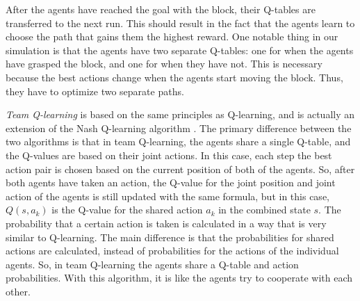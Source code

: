 After the agents have reached the goal with the block, their Q-tables are transferred to the next run. This should result in the fact that the agents learn to choose the path that gains them the highest reward. One notable thing in our simulation is that the agents have two separate Q-tables: one for when the agents have grasped the block, and one for when they have not. This is necessary because the best actions change when the agents start moving the block. Thus, they have to optimize two separate paths.

\textit{Team Q-learning} is based on the same principles as Q-learning, and is actually an extension of the Nash Q-learning algorithm \cite{hu}. The primary difference between the two algorithms is that in team Q-learning, the agents share a single Q-table, and the Q-values are based on their joint actions. In this case, each step the best action pair is chosen based on the current position of both of the agents. So, after both agents have taken an action, the Q-value for the joint position and joint action of the agents is still updated with the same formula, but in this case,  $Q(s,a_{k})$ is the Q-value for the shared action $a_{k}$ in the combined state $s$. The probability that a certain action is taken is calculated in a way that is very similar to Q-learning. The main difference is that the probabilities for shared actions are calculated, instead of probabilities for the actions of the individual agents. So, in team Q-learning the agents share a Q-table and action probabilities. With this algorithm, it is like the agents try to cooperate with each other.
